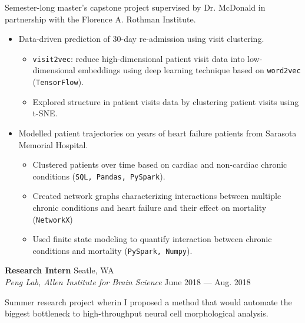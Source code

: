 \documentclass[a4paper,12pt]{article}
\newcommand{\ressubheading}[4]{{\begin{minipage}{\textwidth}
        \textbf{#1} \hfill #2 \\
        \textit{#3} \hfill #4 \\
        \end{minipage}}}
\begin{document}
\vspace{-6pt} Semester-long master's capstone project supervised by Dr. McDonald in partnership with the Florence A. Rothman Institute.


\begin{itemize}
\item Data-driven prediction of 30-day re-admission using visit clustering. 

\begin{itemize}
\item \texttt{visit2vec}: reduce high-dimensional patient visit data into low-dimensional embeddings using deep learning technique based on \texttt{word2vec} (\texttt{TensorFlow}).
\item Explored structure in patient visits data by clustering patient visits using t-SNE.
\end{itemize}



\item Modelled patient trajectories on years of heart failure patients from Sarasota Memorial Hospital.
\begin{itemize}
	\item Clustered patients over time based on cardiac and non-cardiac chronic conditions (\texttt{SQL, Pandas, PySpark}).
	\item Created network graphs characterizing interactions between multiple chronic conditions and heart failure and their effect on mortality (\texttt{NetworkX})
	\item Used finite state modeling to quantify interaction between chronic conditions and mortality (\texttt{PySpark, Numpy}).
\end{itemize}

\end{itemize}

\ressubheading{Research Intern}{Seatle, WA}{Peng Lab, Allen Institute for Brain Science}{June 2018 --- Aug. 2018}

\vspace{-6pt} Summer research project wherin I proposed a method that would automate the biggest bottleneck to high-throughput neural cell morphological analysis. 
\end{document}
